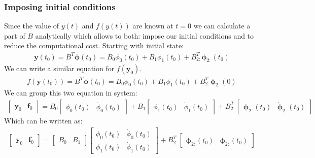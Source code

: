 \documentclass[11pt]{article}
\begin{document}
    \subsubsection{Imposing initial conditions}
    Since the value of $y(t)$ and $f(y(t))$ are known at $t=0$ we can calculate a part of $B$ analytically which
    allows to both: impose our initial conditions and to reduce the computational cost.
    Starting with initial state:
    \begin{align}
        \pmb{y}(t_0) = B^T \pmb\phi(t_0) = B_0 \phi_0(t_0) + B_1 \phi_1(t_0) + B^T_{2:} \pmb\phi_{2:}(t_0)
    \end{align}
    We can write a similar equation for $f(\pmb{y}_0)$.
    \begin{align}
        f(\pmb{y}(t_0)) = B^T \pmb{\dot\phi}(t_0) = B_0 \dot\phi_0(t_0) + B_1 \dot\phi_1(t_0) + B^T_{2:} \pmb{\dot\phi}_{2:}(0)
    \end{align}
    We can group this two equation in system:
    \begin{align}
        \begin{bmatrix}
            \pmb{y}_0 & \pmb{f}_0
        \end{bmatrix} = B_0 \begin{bmatrix}
                                \phi_0(t_0) & \dot\phi_0(t_0)
        \end{bmatrix} +
        B_1 \begin{bmatrix}
                \phi_1(t_0) & \dot\phi_1(t_0)
        \end{bmatrix} +
        B^T_{2:} \begin{bmatrix}
                     \pmb\phi_{2:}(t_0) & \pmb{\dot\phi}_{2:}(t_0)
        \end{bmatrix}
    \end{align}
    Which can be written as:
    \begin{align}
        \begin{bmatrix}
            \pmb{y}_0 & \pmb{f}_0
        \end{bmatrix} =
        \begin{bmatrix}
            B_0 & B_1
        \end{bmatrix}
        \begin{bmatrix}
            \phi_0(t_0) & \dot\phi_0(t_0) \\
            \phi_1(t_0) & \dot\phi_1(t_0)
        \end{bmatrix} +
        B^T_{2:} \begin{bmatrix}
                     \pmb\phi_{2:}(t_0) & \pmb{\dot\phi}_{2:}(t_0)
        \end{bmatrix}
    \end{align}
\end{document}

